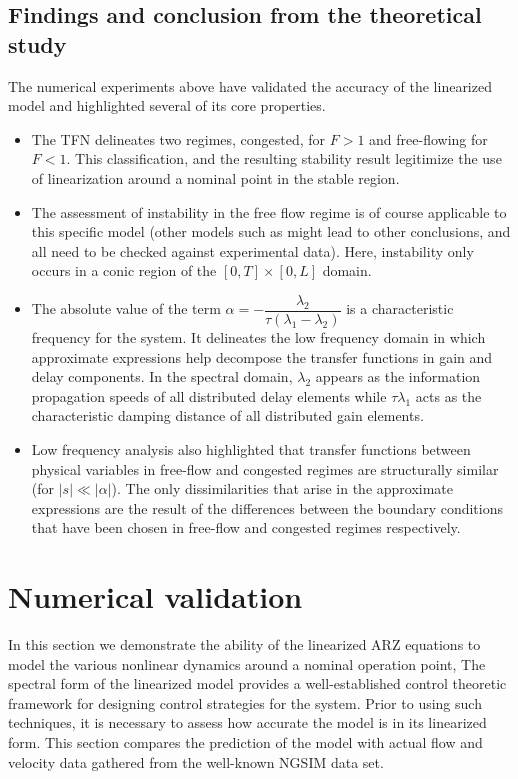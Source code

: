 \documentclass[preprint]{elsarticle}
\begin{document}
\subsection{Findings and conclusion from the theoretical study}
The numerical experiments above have validated the accuracy of the linearized model and highlighted several of its core properties.
\begin{itemize}
\item The TFN delineates two regimes, congested, for $F > 1$ and free-flowing for $F < 1$. This classification, and the resulting stability result legitimize the use of linearization around a nominal point in the stable region.
\item  The assessment of instability in the free flow regime is of course applicable to this specific model (other models such as \cite{Jamitons-multi-valued-fund} might lead to other conclusions, and all need to be checked against experimental data). Here, instability only occurs in a conic region of the  $\left[0,T\right] \times \left[0,L\right]$ domain.
\item The absolute value of the term $\alpha = -\dfrac{\lambda_2}{\tau(\lambda_1 - \lambda_2)}$ is a characteristic frequency for the system. It delineates the low frequency domain in which approximate expressions help decompose the transfer functions in gain and delay components. In the spectral domain, $\lambda_{2}$ appears as the information propagation speeds of all distributed delay elements while  $\tau\lambda_{1}$ acts as the characteristic damping distance of all distributed gain elements.
\item Low frequency analysis also highlighted that transfer functions between physical variables in free-flow and congested regimes are structurally similar (for $\left|s\right|\ll\left|\alpha\right|$). The only dissimilarities that arise in the approximate expressions are the result of the differences between the boundary conditions that have been chosen in free-flow and congested regimes respectively.
\end{itemize}

\section{Numerical validation}

In this section we demonstrate the ability of the linearized ARZ equations to model the various nonlinear dynamics around a nominal operation point, The spectral form of the linearized
model provides a well-established control theoretic framework for designing control strategies for the system. Prior to using such techniques, it is necessary to assess how accurate the
model is in its linearized form. This section compares the prediction of the model with actual flow
and velocity data gathered from the well-known NGSIM data set.
\end{document}
